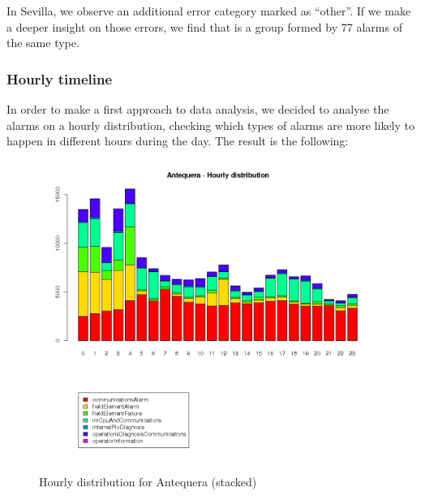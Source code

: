 \documentclass[a4paper,10pt]{report}
\begin{document}
In Sevilla, we observe an additional error category marked as ``other''. If we make a deeper insight on those errors, we find that is a group formed by 77 alarms of the same type.

\subsubsection{Hourly timeline}

In order to make a first approach to data analysis, we decided to analyse the alarms on a hourly distribution, checking which types of alarms are more likely to happen in different hours during the day. The result is the following:

\clearpage

\begin{figure}[h!]
 \centering
 \includegraphics[height=0.4\textheight]{./img/antequera_timeline.png}
 \caption{Hourly distribution for Antequera (stacked)}
\end{figure}
\end{document}
